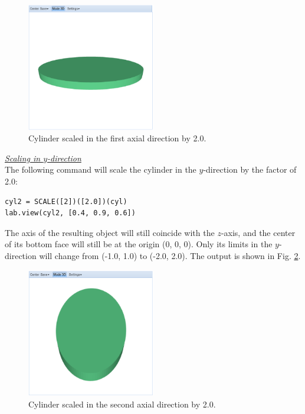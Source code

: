 \documentclass[article,A4,12pt]{llncs}
\begin{document}
\newpage

\begin{figure}[!ht]
\begin{center}
\includegraphics[width=0.5\textwidth]{img/scale-1.png}
\end{center}
\vspace{-2mm}
\caption{Cylinder scaled in the first axial direction by 2.0.}
\label{fig:scale-1}
\end{figure}

\noindent
\underline{\em Scaling in $y$-direction}\\

The following command will 
scale the cylinder in the $y$-direction by the factor of 2.0: 

\begin{verbatim}
cyl2 = SCALE([2])([2.0])(cyl)
lab.view(cyl2, [0.4, 0.9, 0.6])
\end{verbatim}
The axis of the resulting object will still
coincide with the $z$-axis, and the center of its bottom face will
still be at the origin (0, 0, 0). Only its limits in the $y$-direction will change 
from (-1.0, 1.0) to (-2.0, 2.0).
The output is shown in Fig. \ref{fig:scale-2}.

\newpage

\begin{figure}[!ht]
\begin{center}
\includegraphics[width=0.5\textwidth]{img/scale-2.png}
\end{center}
\vspace{-2mm}
\caption{Cylinder scaled in the second axial direction by 2.0.}
\label{fig:scale-2}
\end{figure}
\end{document}
